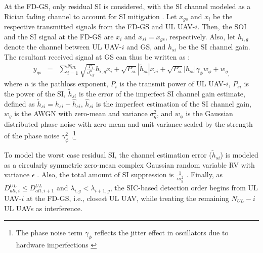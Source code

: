 

At the FD-GS, only residual SI is considered, with the SI channel modeled as a Rician fading channel to account for SI mitigation \cite{tan2018joint,ernest2019outage}. Let $x_{gs}$ and $x_i$ be the respective transmitted signals from the FD-GS and UL UAV-$i$. Then, the SOI and the SI signal at the FD-GS are $x_i$ and $x_{si}=x_{gs}$, respectively. Also, let $h_{i,g}$ denote the channel between UL UAV-$i$ and GS, and $h_{si}$ be the SI channel gain. The resultant received signal at GS can thus be written as \cite{sahai2013impact}:
\begin{eqnarray}
y_{gs} & = & \sum_{i=1}^{N_{UL}} \sqrt{\frac{P_i}{d_{i,g}^{n}}}h_{i,g}x_{i} + \sqrt{P_{si}} |\widetilde{h}_{si}|x_{si} + \sqrt{P_{si}}|h_{si}|\gamma_{\phi}w_{\phi} + {w_{g}}_,
\end{eqnarray} 
where $n$ is the pathloss exponent, $P_i$ is the transmit power of UL UAV-$i$, $P_{si}$ is the power of the SI, $\widetilde{h}_{si}$ is the error of the imperfect SI channel gain estimate, defined as $\widetilde{h}_{si}=h_{si}-\widehat{h}_{si}$, $\widehat{h}_{si}$ is the imperfect estimation of the SI channel gain, $w_{g}$ is the AWGN with zero-mean and variance $\sigma_g^2$, and $w_{\phi}$ is the Gaussian distributed phase noise with zero-mean and unit variance scaled by the strength of the phase noise $\gamma_{\phi}^2$ \cite{sahai2013impact}.\footnote{The phase noise term $\gamma_{\phi}$ reflects the jitter effect in oscillators due to hardware imperfections \cite{sahai2013impact}}

To model the worst case residual SI, the channel estimation error ($\widetilde{h}_{si}$) is modeled as a circularly symmetric zero-mean complex Gaussian random variable RV with variance $\epsilon$ \cite{tan2018joint,ernest2019outage}. Also, the total amount of SI suppression is $\frac{1}{\epsilon\sigma_g^2}$ \cite{ernest2019outage}. Finally, as $D_{alt,i}^{UL} \leq D_{alt,i+1}^{UL}$ and $\lambda_{i,g} < \lambda_{i+1,g}$, the SIC-based detection order begins from UL UAV-$i$ at the FD-GS, i.e., closest UL UAV, while treating the remaining $N_{UL}-i$ UL UAVs as interference.

